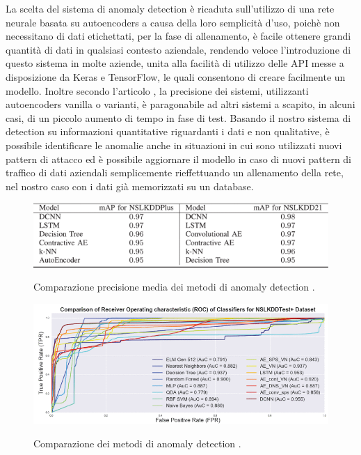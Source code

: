 La scelta del sistema di anomaly detection è ricaduta sull'utilizzo di una rete neurale basata su autoencoders a causa della loro semplicità d'uso, poichè non necessitano di dati etichettati, per la fase di allenamento, è facile ottenere grandi quantità di dati in qualsiasi contesto aziendale, rendendo veloce l'introduzione di questo sistema in molte aziende, unita alla facilità di utilizzo delle API messe a disposizione da Keras e TensorFlow, le quali consentono di creare facilmente un modello.
Inoltre secondo l'articolo \cite{anomaly_detection_comparativa}, la precisione dei sistemi, utilizzanti autoencoders vanilla o varianti, è paragonabile ad altri sistemi a scapito, in alcuni casi, di un piccolo aumento di tempo in fase di test.
Basando il nostro sistema di detection su informazioni quantitative riguardanti i dati e non qualitative, è possibile identificare le anomalie anche in situazioni in cui sono utilizzati nuovi pattern di attacco ed è possibile aggiornare il modello in caso di nuovi pattern di traffico di dati aziendali semplicemente rieffettuando un allenamento della rete, nel nostro caso con i dati già memorizzati su un database.

\begin{figure}[]
    \begin{center}
    \label{fig:anomaly_comparazione_1}
    \includegraphics[width=\hsize]{images/reti_neurali/precisione_media.png}
    \caption{Comparazione precisione media dei metodi di anomaly detection \cite{anomaly_detection_comparativa}.}
    \centering
    \end{center}
\end{figure}

\begin{figure}[]
    \begin{center}
    \label{fig:anomaly_comparazione_2}
    \includegraphics[width=\hsize]{images/reti_neurali/comparazione.png}
    \caption{Comparazione dei metodi di anomaly detection \cite{anomaly_detection_comparativa}.}
    \centering
    \end{center}
\end{figure}

